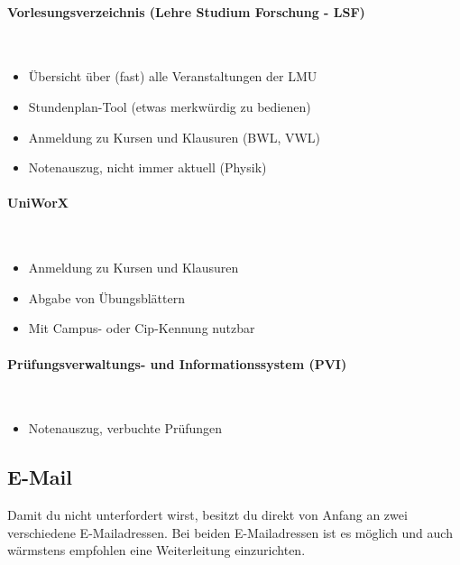 \paragraph{Vorlesungsverzeichnis (Lehre Studium Forschung - LSF)}\hfill\\
\begin{itemize}
	\item Übersicht über (fast) alle Veranstaltungen der LMU
	\item Stundenplan-Tool (etwas merkwürdig zu bedienen)
	\item Anmeldung zu Kursen und Klausuren (BWL, VWL)
        \item Notenauszug, nicht immer aktuell (Physik)
\end{itemize}
\begin{urlList}
\end{urlList}

\paragraph{UniWorX}\subjectList{\subjectMI{}\subjectI{}}\hfill\\
\begin{itemize}
	\item Anmeldung zu Kursen und Klausuren
	\item Abgabe von Übungsblättern
	\item Mit Campus- oder Cip-Kennung nutzbar
\end{itemize}
\begin{urlList}
\end{urlList}

\paragraph{Prüfungsverwaltungs- und Informationssystem (PVI)}\subjectList{\subjectMI{}\subjectI{}}\hfill\\
\begin{itemize}
	\item Notenauszug, verbuchte Prüfungen
\end{itemize}
\begin{urlList}
\end{urlList}

\clearpage

\subsection{E-Mail}
Damit du nicht unterfordert wirst, besitzt du direkt von Anfang an zwei verschiedene E-Mailadressen. Bei beiden E-Mailadressen ist es möglich und auch wärmstens empfohlen eine Weiterleitung einzurichten.\\

